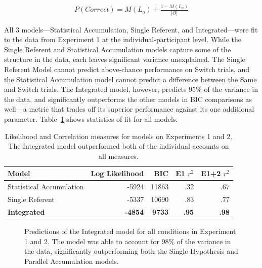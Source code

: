 \documentclass[man,floatsintext]{apa6}
\begin{document}
\begin{align}
P(Correct) = M(L_{o}) + \frac{1-M(L_{o})}{|O|}
\end{align}

All 3 models---Statistical Accumulation, Single Referent, and Integrated---were fit to the data from Experiment 1 at the individual-participant level. While the Single Referent and Statistical Accumulation models capture some of the structure in the data, each leaves significant variance unexplained. The Single Referent Model cannot predict above-chance performance on Switch trials, and the Statistical Accumulation model cannot predict a difference between the Same and Switch trials. The Integrated model, however, predicts 95\% of the variance in the data, and significantly outperforms the other models in BIC comparisons as well---a metric that trades off its superior performance against its one additional parameter. Table~\ref{tab:model} shows statistics of fit for all models.


\begin{table}
\begin{center}
\begin{tabular}{lrrrr}
\hline
Model & Log Likelihood &BIC & E1 $r^{2}$ & E1+2 $r^{2}$ \\
\hline
Statistical Accumulation & -5924 & 11863 & .32  & .67\\
Single Referent & -5337 & 10690 & .83 & .77 \\
\textbf{Integrated} & \textbf{-4854} & \textbf{9733} & \textbf{.95}  & \textbf{.98}\\
\hline
\end{tabular}
\end{center}
\caption{\label{tab:model}Likelihood and Correlation measures for models on Experiments 1 and 2. The Integrated model outperformed both of the individual accounts on all measures.}
\end{table}





 \begin{figure}[!tb]
	\caption{\label{fig:model_fit} Predictions of the Integrated model for all conditions in Experiment 1 and 2. The model was able to account for 98\% of the variance in the data, significantly outperforming both the Single Hypothesis and Parallel Accumulation models.}
\end{figure}
\end{document}
